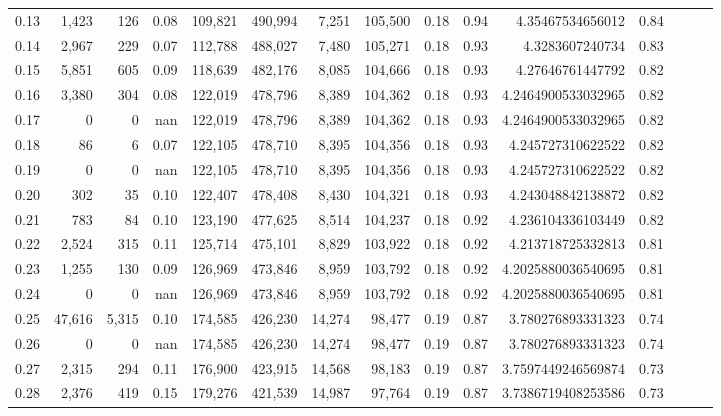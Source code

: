 \begin{tabular}{rrrrrrrrrrrrrrr}
0.13 &   1,423 &    126 &  0.08 &  109,821 &  490,994 &    7,251 &  105,500 &  0.18 &  0.94 &     4.35467534656012 &      0.84 \\
0.14 &   2,967 &    229 &  0.07 &  112,788 &  488,027 &    7,480 &  105,271 &  0.18 &  0.93 &      4.3283607240734 &      0.83 \\
0.15 &   5,851 &    605 &  0.09 &  118,639 &  482,176 &    8,085 &  104,666 &  0.18 &  0.93 &     4.27646761447792 &      0.82 \\
0.16 &   3,380 &    304 &  0.08 &  122,019 &  478,796 &    8,389 &  104,362 &  0.18 &  0.93 &   4.2464900533032965 &      0.82 \\
0.17 &       0 &      0 &   nan &  122,019 &  478,796 &    8,389 &  104,362 &  0.18 &  0.93 &   4.2464900533032965 &      0.82 \\
0.18 &      86 &      6 &  0.07 &  122,105 &  478,710 &    8,395 &  104,356 &  0.18 &  0.93 &    4.245727310622522 &      0.82 \\
0.19 &       0 &      0 &   nan &  122,105 &  478,710 &    8,395 &  104,356 &  0.18 &  0.93 &    4.245727310622522 &      0.82 \\
0.20 &     302 &     35 &  0.10 &  122,407 &  478,408 &    8,430 &  104,321 &  0.18 &  0.93 &    4.243048842138872 &      0.82 \\
0.21 &     783 &     84 &  0.10 &  123,190 &  477,625 &    8,514 &  104,237 &  0.18 &  0.92 &    4.236104336103449 &      0.82 \\
0.22 &   2,524 &    315 &  0.11 &  125,714 &  475,101 &    8,829 &  103,922 &  0.18 &  0.92 &    4.213718725332813 &      0.81 \\
0.23 &   1,255 &    130 &  0.09 &  126,969 &  473,846 &    8,959 &  103,792 &  0.18 &  0.92 &   4.2025880036540695 &      0.81 \\
0.24 &       0 &      0 &   nan &  126,969 &  473,846 &    8,959 &  103,792 &  0.18 &  0.92 &   4.2025880036540695 &      0.81 \\
0.25 &  47,616 &  5,315 &  0.10 &  174,585 &  426,230 &   14,274 &   98,477 &  0.19 &  0.87 &    3.780276893331323 &      0.74 \\
0.26 &       0 &      0 &   nan &  174,585 &  426,230 &   14,274 &   98,477 &  0.19 &  0.87 &    3.780276893331323 &      0.74 \\
0.27 &   2,315 &    294 &  0.11 &  176,900 &  423,915 &   14,568 &   98,183 &  0.19 &  0.87 &   3.7597449246569874 &      0.73 \\
0.28 &   2,376 &    419 &  0.15 &  179,276 &  421,539 &   14,987 &   97,764 &  0.19 &  0.87 &   3.7386719408253586 &      0.73 \\

\end{tabular}
